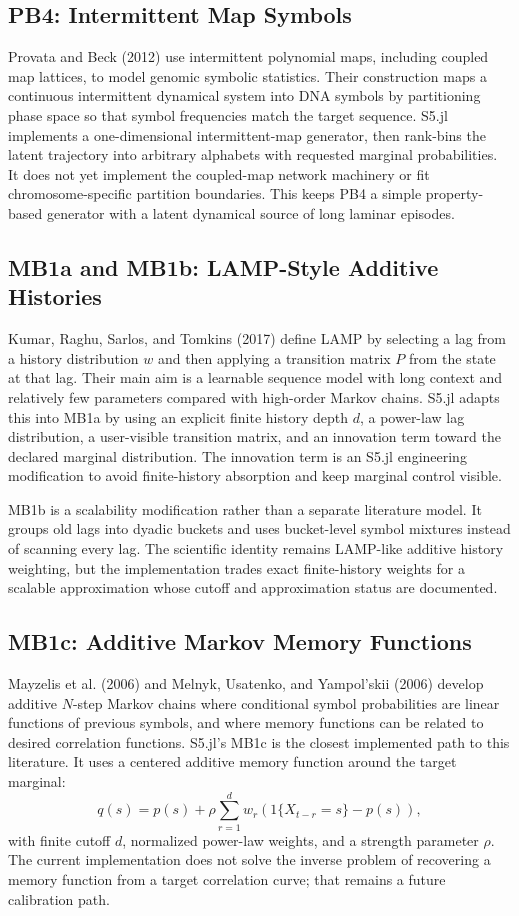 \documentclass[11pt]{article}
\begin{document}
\subsection{PB4: Intermittent Map Symbols}

Provata and Beck (2012) use intermittent polynomial maps, including coupled
map lattices, to model genomic symbolic statistics. Their construction maps a
continuous intermittent dynamical system into DNA symbols by partitioning phase
space so that symbol frequencies match the target sequence. S5.jl implements a
one-dimensional intermittent-map generator, then rank-bins the latent
trajectory into arbitrary alphabets with requested marginal probabilities. It
does not yet implement the coupled-map network machinery or fit
chromosome-specific partition boundaries. This keeps PB4 a simple
property-based generator with a latent dynamical source of long laminar
episodes.

\subsection{MB1a and MB1b: LAMP-Style Additive Histories}

Kumar, Raghu, Sarlos, and Tomkins (2017) define LAMP by selecting a lag from a
history distribution $w$ and then applying a transition matrix $P$ from the
state at that lag. Their main aim is a learnable sequence model with long
context and relatively few parameters compared with high-order Markov chains.
S5.jl adapts this into MB1a by using an explicit finite history depth $d$, a
power-law lag distribution, a user-visible transition matrix, and an innovation
term toward the declared marginal distribution. The innovation term is an
S5.jl engineering modification to avoid finite-history absorption and keep
marginal control visible.

MB1b is a scalability modification rather than a separate literature model. It
groups old lags into dyadic buckets and uses bucket-level symbol mixtures
instead of scanning every lag. The scientific identity remains LAMP-like
additive history weighting, but the implementation trades exact finite-history
weights for a scalable approximation whose cutoff and approximation status are
documented.

\subsection{MB1c: Additive Markov Memory Functions}

Mayzelis et al. (2006) and Melnyk, Usatenko, and Yampol'skii (2006) develop
additive $N$-step Markov chains where conditional symbol probabilities are
linear functions of previous symbols, and where memory functions can be related
to desired correlation functions. S5.jl's MB1c is the closest implemented path
to this literature. It uses a centered additive memory function around the
target marginal:
\[
  q(s) = p(s) + \rho \sum_{r=1}^{d} w_r
  \left(1\{X_{t-r}=s\} - p(s)\right),
\]
with finite cutoff $d$, normalized power-law weights, and a strength parameter
$\rho$. The current implementation does not solve the inverse problem of
recovering a memory function from a target correlation curve; that remains a
future calibration path.
\end{document}
